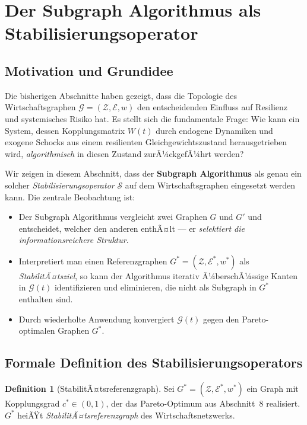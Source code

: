 ﻿\documentclass[a4paper,12pt]{article}
\theoremstyle{definition}
\newtheorem{definition}{Definition}
\begin{document}
\section{Der Subgraph Algorithmus als Stabilisierungsoperator}
\label{sec:stabop}

\subsection{Motivation und Grundidee}

Die bisherigen Abschnitte haben gezeigt, dass die Topologie des Wirtschaftsgraphen
$\mathcal{G} = (\mathcal{Z}, \mathcal{E}, w)$ den entscheidenden Einfluss auf
Resilienz und systemisches Risiko hat. Es stellt sich die fundamentale Frage: Wie kann
ein System, dessen Kopplungsmatrix $W(t)$ durch endogene Dynamiken und exogene Schocks
aus einem resilienten Gleichgewichtszustand herausgetrieben wird, \emph{algorithmisch}
in diesen Zustand zurÃ¼ckgefÃ¼hrt werden?

Wir zeigen in diesem Abschnitt, dass der \textbf{Subgraph Algorithmus} \citep{epp2026subgraph}
als genau ein solcher \emph{Stabilisierungsoperator} $\mathcal{S}$ auf dem Wirtschaftsgraphen
eingesetzt werden kann. Die zentrale Beobachtung ist:

\begin{itemize}
    \item Der Subgraph Algorithmus vergleicht zwei Graphen $G$ und $G'$ und entscheidet,
          welcher den anderen enthÃ¤lt --- er \emph{selektiert die informationsreichere Struktur}.
    \item Interpretiert man einen Referenzgraphen $G^* = (\mathcal{Z}, \mathcal{E}^*, w^*)$
          als \emph{StabilitÃ¤tsziel}, so kann der Algorithmus iterativ Ã¼berschÃ¼ssige Kanten
          in $\mathcal{G}(t)$ identifizieren und eliminieren, die nicht als Subgraph in $G^*$
          enthalten sind.
    \item Durch wiederholte Anwendung konvergiert $\mathcal{G}(t)$ gegen den
          Pareto-optimalen Graphen $G^*$.
\end{itemize}

\subsection{Formale Definition des Stabilisierungsoperators}

\begin{definition}[StabilitÃ¤tsreferenzgraph]
\label{def:refgraph}
    Sei $G^* = (\mathcal{Z}, \mathcal{E}^*, w^*)$ ein Graph mit Kopplungsgrad
    $c^* \in (0,1)$, der das Pareto-Optimum aus Abschnitt~8 realisiert. $G^*$
    heiÃŸt \emph{StabilitÃ¤tsreferenzgraph} des Wirtschaftsnetzwerks.
\end{definition}
\end{document}

